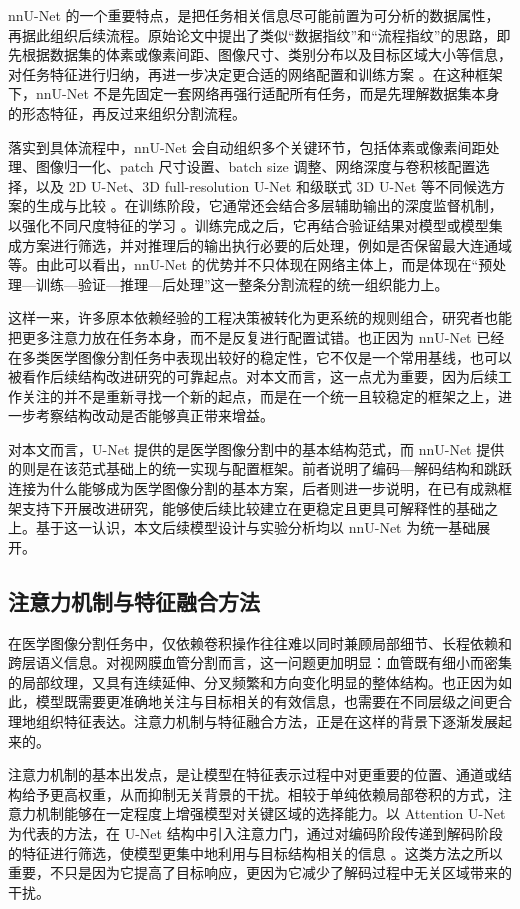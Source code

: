 \documentclass[a4paper,12pt]{article}
\begin{document}
nnU-Net 的一个重要特点，是把任务相关信息尽可能前置为可分析的数据属性，再据此组织后续流程。原始论文中提出了类似“数据指纹”和“流程指纹”的思路，即先根据数据集的体素或像素间距、图像尺寸、类别分布以及目标区域大小等信息，对任务特征进行归纳，再进一步决定更合适的网络配置和训练方案 \cite{isensee2021nnunet}。在这种框架下，nnU-Net 不是先固定一套网络再强行适配所有任务，而是先理解数据集本身的形态特征，再反过来组织分割流程。

落实到具体流程中，nnU-Net 会自动组织多个关键环节，包括体素或像素间距处理、图像归一化、patch 尺寸设置、batch size 调整、网络深度与卷积核配置选择，以及 2D U-Net、3D full-resolution U-Net 和级联式 3D U-Net 等不同候选方案的生成与比较 \cite{isensee2021nnunet}。在训练阶段，它通常还会结合多层辅助输出的深度监督机制，以强化不同尺度特征的学习 \cite{isensee2021nnunet,lee2015dsn}。训练完成之后，它再结合验证结果对模型或模型集成方案进行筛选，并对推理后的输出执行必要的后处理，例如是否保留最大连通域等。由此可以看出，nnU-Net 的优势并不只体现在网络主体上，而是体现在“预处理—训练—验证—推理—后处理”这一整条分割流程的统一组织能力上。

这样一来，许多原本依赖经验的工程决策被转化为更系统的规则组合，研究者也能把更多注意力放在任务本身，而不是反复进行配置试错。也正因为 nnU-Net 已经在多类医学图像分割任务中表现出较好的稳定性，它不仅是一个常用基线，也可以被看作后续结构改进研究的可靠起点。对本文而言，这一点尤为重要，因为后续工作关注的并不是重新寻找一个新的起点，而是在一个统一且较稳定的框架之上，进一步考察结构改动是否能够真正带来增益。

对本文而言，U-Net 提供的是医学图像分割中的基本结构范式，而 nnU-Net 提供的则是在该范式基础上的统一实现与配置框架。前者说明了编码—解码结构和跳跃连接为什么能够成为医学图像分割的基本方案，后者则进一步说明，在已有成熟框架支持下开展改进研究，能够使后续比较建立在更稳定且更具可解释性的基础之上。基于这一认识，本文后续模型设计与实验分析均以 nnU-Net 为统一基础展开。

\subsection{注意力机制与特征融合方法}
在医学图像分割任务中，仅依赖卷积操作往往难以同时兼顾局部细节、长程依赖和跨层语义信息。对视网膜血管分割而言，这一问题更加明显：血管既有细小而密集的局部纹理，又具有连续延伸、分叉频繁和方向变化明显的整体结构。也正因为如此，模型既需要更准确地关注与目标相关的有效信息，也需要在不同层级之间更合理地组织特征表达。注意力机制与特征融合方法，正是在这样的背景下逐渐发展起来的。

注意力机制的基本出发点，是让模型在特征表示过程中对更重要的位置、通道或结构给予更高权重，从而抑制无关背景的干扰。相较于单纯依赖局部卷积的方式，注意力机制能够在一定程度上增强模型对关键区域的选择能力。以 Attention U-Net 为代表的方法，在 U-Net 结构中引入注意力门，通过对编码阶段传递到解码阶段的特征进行筛选，使模型更集中地利用与目标结构相关的信息 \cite{oktay2018attentionunet}。这类方法之所以重要，不只是因为它提高了目标响应，更因为它减少了解码过程中无关区域带来的干扰。
\end{document}

